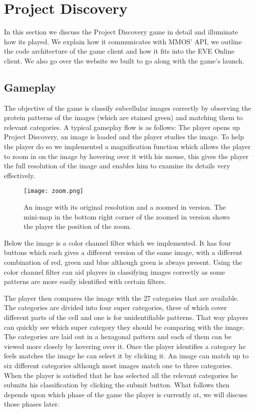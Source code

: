 \section{Project Discovery}\label{sec:projectdiscovery}
	In this section we discuss the Project Discovery game in detail and illuminate how its played. We explain how it communicates with MMOS' API, we outline the code architecture of the game client and how it fits into the EVE Online client. We also go over the website we built to go along with the game's launch.

\subsection{Gameplay}
	The objective of the game is classify subcellular images correctly by observing the protein patterns of the images (which are stained green) and matching them to relevant categories. A typical gameplay flow is as follows: The player opens up Project Discovery, an image is loaded and the player studies the image. To help the player do so we implemented a magnification function which allows the player to zoom in on the image by hovering over it with his mouse, this gives the player the full resolution of the image and enables him to examine its details very effectively.

	\begin{figure}[H]
	  \centering
	  \graphicspath{ {./graphics/} }
	  \centerline{\texttt{[image: zoom.png]}}
	  \caption{\label{fig:zoom}An image with its original resolution and a zoomed in version. The mini-map in the bottom right corner of the zoomed in version shows the player the position of the zoom.}
	\end{figure}

	Below the image is a color channel filter which we implemented. It has four buttons which each gives a different version of the same image, with a different combination of red, green and blue although green is always present. Using the color channel filter can aid players in classifying images correctly as some patterns are more easily identified with certain filters.

	The player then compares the image with the 27 categories that are available. The categories are divided into four super categories, three of which cover different parts of the cell and one is for unidentifiable patterns. That way players can quickly see which super category they should be comparing with the image. The categories are laid out in a hexagonal pattern and each of them can be viewed more closely by hovering over it. Once the player identifies a category he feels matches the image he can select it by clicking it. An image can match up to six different categories although most images match one to three categories. When the player is satisfied that he has selected all the relevant categories he submits his classification by clicking the submit button. What follows then depends upon which phase of the game the player is currently at, we will discuss those phases later.

